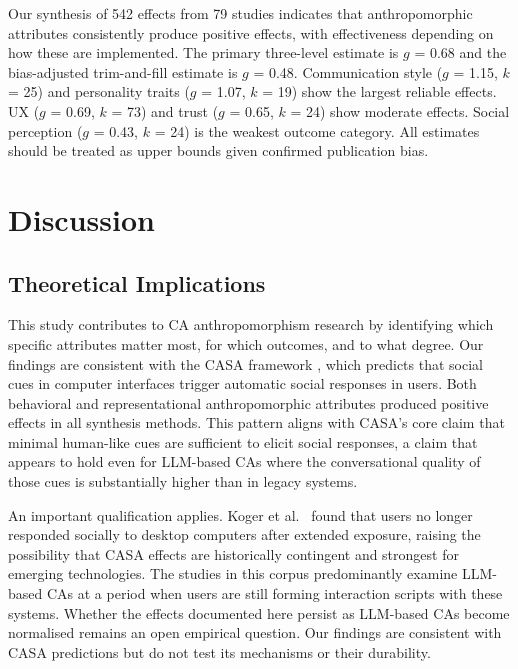 \documentclass[lettersize,journal]{IEEEtran}
\begin{document}
Our synthesis of 542 effects from 79 studies indicates that anthropomorphic attributes consistently produce positive effects, with effectiveness depending on how these are implemented. The primary three-level estimate is $g$ = 0.68 and the bias-adjusted trim-and-fill estimate is $g$ = 0.48. Communication style ($g$ = 1.15, $k$ = 25) and personality traits ($g$ = 1.07, $k$ = 19) show the largest reliable effects. UX ($g$ = 0.69, $k$ = 73) and trust ($g$ = 0.65, $k$ = 24) show moderate effects. Social perception ($g$ = 0.43, $k$ = 24) is the weakest outcome category. All estimates should be treated as upper bounds given confirmed publication bias.

\section{Discussion}

\subsection{Theoretical Implications}

This study contributes to CA anthropomorphism research by identifying which specific attributes matter most, for which outcomes, and to what degree. Our findings are consistent with the CASA framework \cite{nass1994computers}, which predicts that social cues in computer interfaces trigger automatic social responses in users. Both behavioral and representational anthropomorphic attributes produced positive effects in all synthesis methods. This pattern aligns with CASA's core claim that minimal human-like cues are sufficient to elicit social responses, a claim that appears to hold even for LLM-based CAs where the conversational quality of those cues is substantially higher than in legacy systems.

An important qualification applies. Koger et al.\ \cite{koger2023casa} found that users no longer responded socially to desktop computers after extended exposure, raising the possibility that CASA effects are historically contingent and strongest for emerging technologies. The studies in this corpus predominantly examine LLM-based CAs at a period when users are still forming interaction scripts with these systems. Whether the effects documented here persist as LLM-based CAs become normalised remains an open empirical question. Our findings are consistent with CASA predictions but do not test its mechanisms or their durability.
\end{document}
